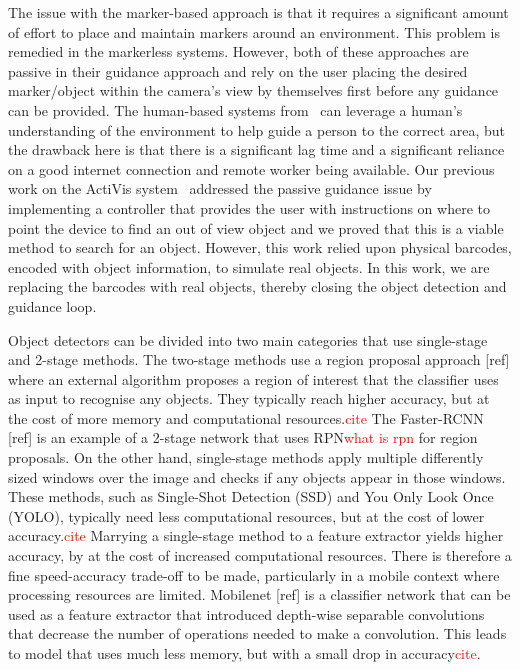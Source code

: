 \documentclass[runningheads]{llncs}
\newcommand\todo[1]{\textcolor{red}{#1}}
\begin{document}
The issue with the marker-based approach is that it requires a significant amount of effort to place and maintain markers around an environment.
This problem is remedied in the markerless systems.
However, both of these approaches are passive in their guidance approach and rely on the user placing the desired marker/object within the camera's view by themselves first before any guidance can be provided. 
The human-based systems from~\cite{bigham2010vizwiz,bemyeyes2019} can leverage a human's understanding of the environment to help guide a person to the correct area, but the drawback here is that there is a significant lag time and a significant reliance on a good internet connection and remote worker being available. 
Our previous work on the ActiVis system~\cite{lock2019active} addressed the passive guidance issue by implementing a controller that provides the user with instructions on where to point the device to find an out of view object and we proved that this is a viable method to search for an object. 
However, this work relied upon physical barcodes, encoded with object information, to simulate real objects.
In this work, we are replacing the barcodes with real objects, thereby closing the object detection and guidance loop. 

Object detectors can be divided into two main categories that use single-stage and 2-stage methods.  
The two-stage methods use a region proposal approach [ref] where an external algorithm proposes a region of interest that the classifier uses as input to recognise any objects. 
They typically reach higher accuracy, but at the cost of more memory and computational resources.\todo{cite}
The Faster-RCNN [ref] is an example of a 2-stage network that uses RPN\todo{what is rpn} for region proposals. 
On the other hand, single-stage methods apply multiple differently sized windows over the image and checks if any objects appear in those windows. 
These methods, such as Single-Shot Detection (SSD) and You Only Look Once (YOLO), typically need less computational resources, but at the cost of lower accuracy.\todo{cite} 
Marrying a single-stage method to a feature extractor yields higher accuracy, by at the cost of increased computational resources. 
There is therefore a fine speed-accuracy trade-off to be made, particularly in a mobile context where processing resources are limited. 
Mobilenet [ref] is a classifier network that can be used as a feature extractor  that introduced depth-wise separable convolutions that decrease the number of operations needed to make a convolution.
This leads to model that uses much less memory, but with a small drop in accuracy\todo{cite}.
\end{document}
